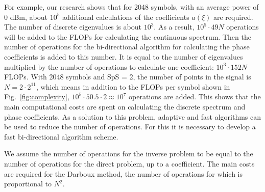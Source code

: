 For example, our research shows that for 2048 symbols, with an average power of 0 dBm, about $10^5$ additional calculations of the coefficients $a(\xi)$ are required. The number of discrete eigenvalues is about $10^3$. As a result, $10^5 \cdot 49 N$ operations will be added to the FLOPs for calculating the continuous spectrum. Then the number of operations for the bi-directional algorithm for calculating the phase coefficients is added to this number. It is equal to the number of eigenvalues multiplied by the number of operations to calculate one coefficient: $10^3 \cdot 152 N$ FLOPs. With 2048 symbols and SpS = 2, the number of points in the signal is $N = 2 \cdot 2^{11}$, which means in addition to the FLOPs per symbol shown in Fig.~\ref{fig:complexity}, $10^5 \cdot 50.5 \cdot 2 \approx 10^7$ operations are added. This shows that the main computational costs are spent on calculating the discrete spectrum and phase coefficients. As a solution to this problem, adaptive and fast algorithms can be used to reduce the number of operations. For this it is necessary to develop a fast bi-directional algorithm scheme.

We assume the number of operations for the inverse problem to be equal to the number of operations for the direct problem, up to a coefficient. The main costs are required for the Darboux method, the number of operations for which is proportional to $N^2$.


